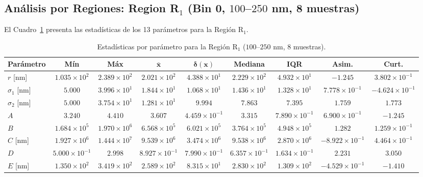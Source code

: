 \documentclass{article}
\begin{document}
\subsection{An\'alisis por Regiones: Region R$_1$ (Bin 0, $100$--$250$ nm, 8 muestras)}

El Cuadro~\ref{tab:bin0} presenta las estad\'isticas de los 13 par\'ametros para la Regi\'on R$_1$.

\begin{table}[htbp]
\centering
\caption{Estad\'isticas por par\'ametro para la Regi\'on R$_1$ ($100$--$250$ nm, 8 muestras).}
\label{tab:bin0}
\begin{tabular}{@{}lcccccccc@{}} %
\toprule
\textbf{Par\'ametro} & \textbf{M\'in} & \textbf{M\'ax} & $\boldsymbol{\bar{x}}$ & $\boldsymbol{\delta(x)}$ & \textbf{Mediana} & \textbf{IQR} & \textbf{Asim.} & \textbf{Curt.} \\
\midrule
$r$ [nm] & $1.035 \times 10^2$ & $2.389 \times 10^2$ & $2.021 \times 10^2$ & $4.388 \times 10^1$ & $2.229 \times 10^2$ & $4.932 \times 10^1$ & $-1.245$ & $3.802 \times 10^{-1}$ \\
$\sigma_{1}$ [nm] & $5.000$ & $3.996 \times 10^1$ & $1.844 \times 10^1$ & $1.068 \times 10^1$ & $1.436 \times 10^1$ & $1.328 \times 10^1$ & $7.778 \times 10^{-1}$ & $-4.624 \times 10^{-1}$ \\
$\sigma_{2}$ [nm] & $5.000$ & $3.754 \times 10^1$ & $1.281 \times 10^1$ & $9.994$ & $7.863$ & $7.395$ & $1.759$ & $1.773$ \\
$A$ & $3.240$ & $4.410$ & $3.607$ & $4.459 \times 10^{-1}$ & $3.315$ & $7.890 \times 10^{-1}$ & $6.900 \times 10^{-1}$ & $-1.245$ \\
$B$ & $1.684 \times 10^5$ & $1.970 \times 10^6$ & $6.568 \times 10^5$ & $6.021 \times 10^5$ & $3.764 \times 10^5$ & $4.948 \times 10^5$ & $1.282$ & $1.259 \times 10^{-1}$ \\
$C$ [nm] & $1.927 \times 10^6$ & $1.444 \times 10^7$ & $9.539 \times 10^6$ & $3.474 \times 10^6$ & $9.538 \times 10^6$ & $2.870 \times 10^6$ & $-8.922 \times 10^{-1}$ & $4.464 \times 10^{-1}$ \\
$D$ & $5.000 \times 10^{-1}$ & $2.998$ & $8.927 \times 10^{-1}$ & $7.990 \times 10^{-1}$ & $6.357 \times 10^{-1}$ & $1.634 \times 10^{-1}$ & $2.231$ & $3.050$ \\
$E$ [nm] & $1.350 \times 10^2$ & $3.419 \times 10^2$ & $2.589 \times 10^2$ & $8.315 \times 10^1$ & $2.830 \times 10^2$ & $1.309 \times 10^2$ & $-4.529 \times 10^{-1}$ & $-1.410$ \\

\end{tabular}
\end{table}
\end{document}
